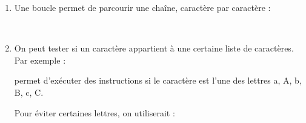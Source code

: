 \documentclass[11pt,class=report,crop=false]{standalone}
\begin{document}
\begin{cours}

\sauteligne

\begin{enumerate}
  \item Une boucle  permet de parcourir une chaîne, caractère par caractère :
  \begin{center}
  \begin{minipage}{0.4\textwidth}
  \\
  \indentation {}
  \end{minipage}
  \end{center}

  \item On peut tester si un caractère appartient à une certaine liste de caractères. Par exemple : 
    
  \smallskip
    
  \centerline{}
  
  
  permet d’exécuter des instructions si le caractère   est l'une des lettres a, A, b, B, c, C. 
  
  Pour éviter certaines lettres, on utiliserait : 
  
  \smallskip
  
  \centerline{}
  

  \end{enumerate}  
\end{cours}



\end{document}
